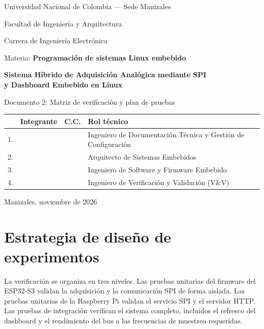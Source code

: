 \documentclass[12pt,a4paper]{article}
\begin{document}
\begin{titlepage}
\centering
{\large Universidad Nacional de Colombia --- Sede Manizales\par}
{\large Facultad de Ingeniería y Arquitectura\par}
{\large Carrera de Ingeniería Electrónica\par}
\vspace{1.2cm}
{\large Materia: \textbf{Programación de sistemas Linux embebido}\par}
\vspace{1.8cm}
{\LARGE\bfseries Sistema Híbrido de Adquisición Analógica mediante SPI\\[0.3cm]
y Dashboard Embebido en Linux\par}
\vspace{0.5cm}
{\Large Documento 2: Matriz de verificación y plan de pruebas\par}
\vspace{1.5cm}

\small
\begin{tabular}{@{}p{0.5cm} p{4.2cm} p{2.8cm} p{6.0cm}@{}}
\toprule
& \textbf{Integrante} & \textbf{C.C.} & \textbf{Rol técnico} \\
\midrule
1. & \hrulefill & \hrulefill & Ingeniero de Documentación Técnica y Gestión de Configuración \\[0.7cm]
2. & \hrulefill & \hrulefill & Arquitecto de Sistemas Embebidos \\[0.7cm]
3. & \hrulefill & \hrulefill & Ingeniero de Software y Firmware Embebido \\[0.7cm]
4. & \hrulefill & \hrulefill & Ingeniero de Verificación y Validación (V\&V) \\[0.7cm]
\bottomrule
\end{tabular}

\vfill
Manizales, noviembre de 2026
\end{titlepage}

\tableofcontents
\newpage

\section{Estrategia de diseño de experimentos}

La verificación se organiza en tres niveles. Las pruebas unitarias del firmware del ESP32-S3 validan la adquisición y la comunicación SPI de forma aislada. Las pruebas unitarias de la Raspberry Pi validan el servicio SPI y el servidor HTTP. Las pruebas de integración verifican el sistema completo, incluidos el refresco del dashboard y el rendimiento del bus a las frecuencias de muestreo requeridas.
\end{document}
